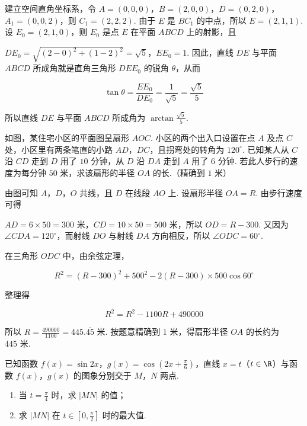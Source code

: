 \begin{solution}
建立空间直角坐标系，令 \(A=(0,0,0)\)，\(B=(2,0,0)\)，\(D=(0,2,0)\)，\(A_1=(0,0,2)\)，则 \(C_1=(2,2,2)\). 由于 \(E\) 是 \(BC_1\) 的中点，所以 \(E=(2,1,1)\). 设 \(E_0=(2,1,0)\)，则 \(E_0\) 是点 \(E\) 在平面 \(ABCD\) 上的射影，且

\(DE_0=\sqrt{(2-0)^2+(1-2)^2}=\sqrt{5}\)，\(EE_0=1\). 因此，直线 \(DE\) 与平面 \(ABCD\) 所成角就是直角三角形 \(DEE_0\) 的锐角 \(\theta\)，从而

\[
\tan\theta=\frac{EE_0}{DE_0}=\frac{1}{\sqrt{5}}=\frac{\sqrt{5}}{5}
\]

所以直线 \(DE\) 与平面 \(ABCD\) 所成角为 \(\arctan\frac{\sqrt{5}}{5}\).
\end{solution}

\begin{problem}
如图，某住宅小区的平面图呈扇形 \(AOC\). 小区的两个出入口设置在点 \(A\) 及点 \(C\) 处，小区里有两条笔直的小路 \(AD\)，\(DC\)，且拐弯处的转角为 \(120^{\circ}\). 已知某人从 \(C\) 沿 \(CD\) 走到 \(D\) 用了 \(10\text{ 分钟}\)，从 \(D\) 沿 \(DA\) 走到 \(A\) 用了 \(6\text{ 分钟}\). 若此人步行的速度为每分钟 \(50\text{ 米}\)，求该扇形的半径 \(OA\) 的长.（精确到 \(1\text{ 米}\)）

\FloatBarrier
\end{problem}

\begin{solution}
由图可知 \(A\)，\(D\)，\(O\) 共线，且 \(D\) 在线段 \(AO\) 上. 设扇形半径 \(OA=R\). 由步行速度可得

\(AD=6\times50=300\text{ 米}\)，\(CD=10\times50=500\text{ 米}\)，所以 \(OD=R-300\). 又因为 \(\angle CDA=120^{\circ}\)，而射线 \(DO\) 与射线 \(DA\) 方向相反，所以 \(\angle ODC=60^{\circ}\).

在三角形 \(ODC\) 中，由余弦定理，

\[
R^2=(R-300)^2+500^2-2(R-300)\times500\cos60^{\circ}
\]

整理得

\[
R^2=R^2-1100R+490000
\]

所以 \(R=\frac{490000}{1100}=445.\overline{45}\text{ 米}\). 按题意精确到 \(1\) 米，得扇形半径 \(OA\) 的长约为 \(445\text{ 米}\).
\end{solution}

\begin{problem}
已知函数 \(f(x) = \sin 2x\)，\(g(x) = \cos \left(2x + \frac{\pi}{6}\right)\)，直线 \(x = t\)（\(t \in \R\)）与函数 \(f(x)\)，\(g(x)\) 的图象分别交于 \(M\)，\(N\) 两点.

\begin{enumerate}
\item 当 \(t = \frac{\pi}{4}\) 时，求 \(|MN|\) 的值；
\item 求 \(\left|MN\right|\) 在 \(t \in \left[0, \frac{\pi}{2}\right]\) 时的最大值.
\end{enumerate}
\end{problem}

